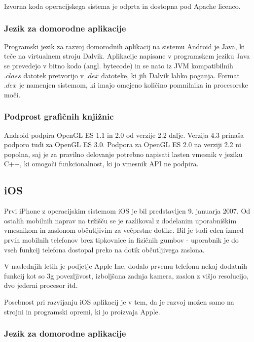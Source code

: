 Izvorna koda operacijskega sistema je odprta in dostopna pod Apache licenco.

\subsubsection{Jezik za domorodne aplikacije}

Programski jezik za razvoj domorodnih aplikacij na sistemu Android je Java, ki teče na virtualnem stroju Dalvik. Aplikacije napisane v programskem jeziku Java se prevedejo v bitno kodo (angl. bytecode) in se nato iz JVM kompatibilnih $.class$ datotek pretvorijo v $.dex$ datoteke, ki jih Dalvik lahko poganja. Format $.dex$ je namenjen sistemom, ki imajo omejeno količino pomnilnika in procesorske moči.

\subsubsection{Podprost grafičnih knjižnic}

Android podpira OpenGL ES 1.1 in 2.0 od verzije 2.2 dalje. Verzija 4.3 prinaša podporo tudi za OpenGL ES 3.0. Podpora za OpenGL ES 2.0 na verziji 2.2 ni popolna, saj je za pravilno delovanje potrebno napisati lasten vmesnik v jeziku C++, ki omogoči funkcionalnost, ki jo vmesnik API ne podpira.

\subsection{iOS}

Prvi iPhone z operacijskim sistemom iOS \cite{ios} je bil predstavljen 9. januarja 2007. Od ostalih mobilnih naprav na tržišču se je razlikoval z dodelanim uporabniškim vmesnikom in zaslonom občutljivim za večprstne dotike. Bil je tudi eden izmed prvih mobilnih telefonov brez tipkovnice in fizičnih gumbov - uporabnik je do vseh funkcij telefona dostopal preko na dotik občutljivega zaslona.

V naslednjih letih je podjetje Apple Inc. dodalo prvemu telefonu nekaj dodatnih funkcij kot so 3g povezljivost, izboljšana zadnja kamera, zaslon z višjo resolucijo, dvo jederni procesor itd.

Posebnost pri razvijanju iOS aplikacij je v tem, da je razvoj možen samo na strojni in programski opremi, ki jo proizvaja Apple.

\subsubsection{Jezik za domorodne aplikacije} 

